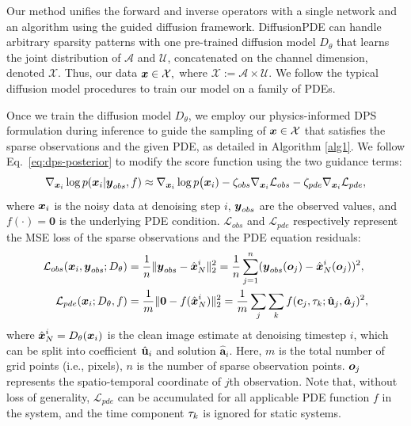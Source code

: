 Our method unifies the forward and inverse operators with a single network and an algorithm using the guided diffusion framework. DiffusionPDE can handle arbitrary sparsity patterns with one pre-trained diffusion model $D_\theta$ that learns the joint distribution of $\mathcal{A}$ and $\mathcal{U}$, concatenated on the channel dimension, denoted $\mathcal{X}$. Thus, our data $\boldsymbol{x} \in \mathcal{X},$ where $\mathcal{X}:=\mathcal{A}\times \mathcal{U}.$ We follow the typical diffusion model procedures \cite{Karras2022edm} to train our model on a family of PDEs.


Once we train the diffusion model $D_\theta$, we employ our physics-informed DPS \cite{chung2022diffusion} formulation during inference to guide the sampling of $\boldsymbol{x}\in \mathcal{X}$ that satisfies the sparse observations and the given PDE, as detailed in Algorithm \ref{alg1}. We follow Eq.~\ref{eq:dps-posterior} to modify the score function using the two guidance terms:
\begin{equation}\label{eq:diffusionpde-loss}
    \nabla_{\boldsymbol{x}_i}\log p(\boldsymbol{x}_i|\boldsymbol{y}_{obs},f)\approx \nabla_{\boldsymbol{x}_i}\log p\big(\boldsymbol{x}_i)-\zeta_{obs}\nabla_{\boldsymbol{x}_i}\mathcal{L}_{obs}-\zeta_{pde}\nabla_{\boldsymbol{x}_i}\mathcal{L}_{pde},
\end{equation}
where $\boldsymbol{x}_i$ is the noisy data at denoising step $i$, $\boldsymbol{y}_{obs}$ are the observed values, and $f(\cdot)=\mathbf{0}$ is the underlying PDE condition. $\mathcal{L}_{obs}$ and $\mathcal{L}_{pde}$ respectively represent the MSE loss of the sparse observations and the PDE equation residuals:
\begin{equation}
    \begin{aligned}\label{eq:loss_terms}
    \mathcal{L}_{obs}(\boldsymbol{x}_i,\boldsymbol{y}_{obs};D_\theta) &=\frac{1}{n}\|\boldsymbol{y}_{obs}-\hat{\boldsymbol{x}}_N^i\|_2^2= \frac1n\sum_{j=1}^n(\boldsymbol{y}_{obs}(\boldsymbol{o}_j)-\hat{\boldsymbol{x}}_N^i(\boldsymbol{o}_j))^2, \\
\mathcal{L}_{pde}(\boldsymbol{x}_i;D_\theta,f)&=\frac{1}{m}\|\mathbf{0}-f(\hat{\boldsymbol{x}}_N^i)\|_2^2=\frac1m\sum_{j}\sum_k f(\boldsymbol{c}_j,\tau_k;\hat{\mathbf{u}}_j,\hat{\boldsymbol{a}}_j)^2,
    \end{aligned}
\end{equation}
where $\hat{\boldsymbol{x}}_N^i=D_\theta(\boldsymbol{x}_i)$ is the clean image estimate at denoising timestep $i$, which can be split into coefficient $\hat{\mathbf{u}}_i$ and solution $\hat{\boldsymbol{a}}_i.$
Here, $m$ is the total number of grid points (i.e., pixels), $n$ is the number of sparse observation points. $\boldsymbol{o}_j$ represents the spatio-temporal coordinate of $j$th observation. Note that, without loss of generality, $\mathcal{L}_{pde}$ can be accumulated for all applicable PDE function $f$ in the system, and the time component $\tau_k$ is ignored for static systems.

